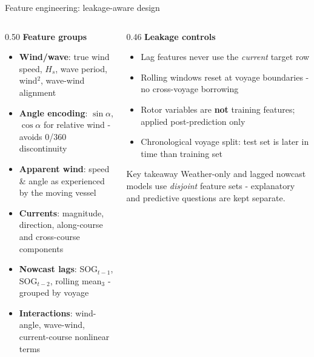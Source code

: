 \documentclass[aspectratio=169]{beamer}
\begin{document}
\begin{frame}{Feature engineering: leakage-aware design}
\begin{columns}
\begin{column}{0.50\textwidth}
\footnotesize
\textbf{Feature groups}
\begin{itemize}
  \item \textbf{Wind/wave}: true wind speed, $H_s$, wave period, wind$^2$, wave-wind alignment
  \item \textbf{Angle encoding}: $\sin\alpha$, $\cos\alpha$ for relative wind - avoids 0/360 discontinuity
  \item \textbf{Apparent wind}: speed \& angle as experienced by the moving vessel
  \item \textbf{Currents}: magnitude, direction, along-course and cross-course components
  \item \textbf{Nowcast lags}: SOG$_{t-1}$, SOG$_{t-2}$, rolling mean$_3$ - grouped by voyage
  \item \textbf{Interactions}: wind-angle, wave-wind, current-course nonlinear terms
\end{itemize}
\end{column}
\begin{column}{0.46\textwidth}
\footnotesize
\textbf{Leakage controls}
\begin{itemize}
  \item Lag features never use the \textit{current} target row
  \item Rolling windows reset at voyage boundaries - no cross-voyage borrowing
  \item Rotor variables are \textbf{not} training features; applied post-prediction only
  \item Chronological voyage split: test set is later in time than training set
\end{itemize}

\begin{block}{Key takeaway}
Weather-only and lagged nowcast models use \emph{disjoint} feature sets - explanatory and predictive questions are kept separate.
\end{block}
\end{column}
\end{columns}
\end{frame}
\end{document}
